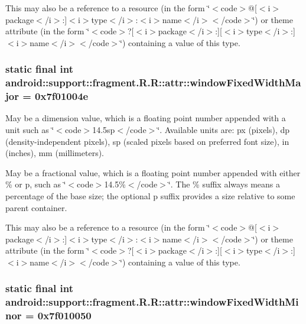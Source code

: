 This may also be a reference to a resource (in the form \char`\"{}$<$code$>$@\mbox{[}$<$i$>$package$<$/i$>$:\mbox{]}$<$i$>$type$<$/i$>$:$<$i$>$name$<$/i$>$$<$/code$>$\char`\"{}) or theme attribute (in the form \char`\"{}$<$code$>$?\mbox{[}$<$i$>$package$<$/i$>$:\mbox{]}\mbox{[}$<$i$>$type$<$/i$>$:\mbox{]}$<$i$>$name$<$/i$>$$<$/code$>$\char`\"{}) containing a value of this type. \hypertarget{classandroid_1_1support_1_1fragment_1_1_r_1_1attr_dd7289f5d965d3f42cb127c75701c33f}{
\subsubsection[{windowFixedWidthMajor}]{\setlength{\rightskip}{0pt plus 5cm}static final int android::support::fragment.R.R::attr::windowFixedWidthMajor = 0x7f01004e}}
\label{classandroid_1_1support_1_1fragment_1_1_r_1_1attr_dd7289f5d965d3f42cb127c75701c33f}


May be a dimension value, which is a floating point number appended with a unit such as \char`\"{}$<$code$>$14.5sp$<$/code$>$\char`\"{}. Available units are: px (pixels), dp (density-independent pixels), sp (scaled pixels based on preferred font size), in (inches), mm (millimeters). 

May be a fractional value, which is a floating point number appended with either \% or p, such as \char`\"{}$<$code$>$14.5\%$<$/code$>$\char`\"{}. The \% suffix always means a percentage of the base size; the optional p suffix provides a size relative to some parent container. 

This may also be a reference to a resource (in the form \char`\"{}$<$code$>$@\mbox{[}$<$i$>$package$<$/i$>$:\mbox{]}$<$i$>$type$<$/i$>$:$<$i$>$name$<$/i$>$$<$/code$>$\char`\"{}) or theme attribute (in the form \char`\"{}$<$code$>$?\mbox{[}$<$i$>$package$<$/i$>$:\mbox{]}\mbox{[}$<$i$>$type$<$/i$>$:\mbox{]}$<$i$>$name$<$/i$>$$<$/code$>$\char`\"{}) containing a value of this type. \hypertarget{classandroid_1_1support_1_1fragment_1_1_r_1_1attr_67a87765078337303d31060dd298999b}{
\subsubsection[{windowFixedWidthMinor}]{\setlength{\rightskip}{0pt plus 5cm}static final int android::support::fragment.R.R::attr::windowFixedWidthMinor = 0x7f010050}}
\label{classandroid_1_1support_1_1fragment_1_1_r_1_1attr_67a87765078337303d31060dd298999b}


